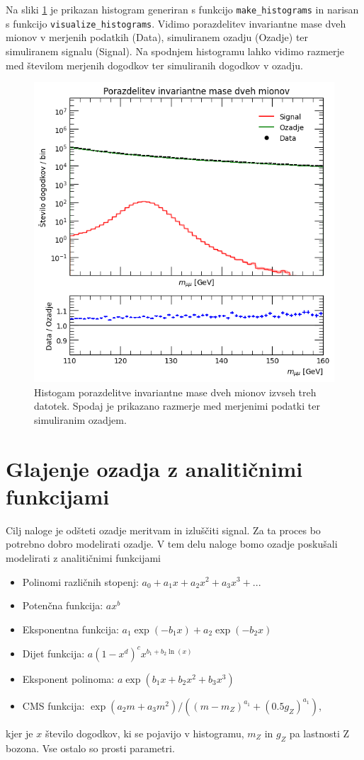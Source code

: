 \documentclass[slovene,11pt,a4paper]{article}
\begin{document}
Na sliki \ref{fig:my_hist} je prikazan histogram generiran s funkcijo \texttt{make\_histograms} in narisan s funkcijo \linebreak \texttt{visualize\_histograms}. Vidimo porazdelitev invariantne mase dveh mionov v merjenih podatkih (Data), simuliranem ozadju (Ozadje) ter simuliranem signalu (Signal). Na spodnjem histogramu lahko vidimo razmerje med številom merjenih dogodkov ter simuliranih dogodkov v ozadju.

\begin{figure}[h!]
    \centering
    \includegraphics[width=0.8\linewidth]{imgs/my_hist.png}
    \caption{Histogam porazdelitve invariantne mase dveh mionov izvseh treh datotek. Spodaj je prikazano razmerje med merjenimi podatki ter simuliranim ozadjem.}
    \label{fig:my_hist}
\end{figure}

\section{Glajenje ozadja z analitičnimi funkcijami}

Cilj naloge je odšteti ozadje meritvam in izluščiti signal. Za ta proces bo potrebno dobro modelirati ozadje. V tem delu naloge bomo ozadje poskušali modelirati z analitičnimi funkcijami

\begin{itemize}
    \item Polinomi različnih stopenj: $a_0 + a_1 x + a_2 x^2 + a_3 x^3 + ...$
    \item Potenčna funkcija: $ax^b$
    \item Eksponentna funkcija: $a_1 \exp(-b_1 x) + a_2 \exp(-b_2 x)$
    \item Dijet funkcija: $a(1-x^d)^c x^{b_1 + b_2 \ln(x)}$
    \item Eksponent polinoma: $a \exp(b_1 x + b_2 x^2 + b_3 x^3)$
    \item CMS funkcija: $\exp(a_2 m + a_3 m^2) / ((m-m_Z)^{a_1} + (0.5g_Z)^{a_1})$,
\end{itemize}
kjer je $x$ število dogodkov, ki se pojavijo v histogramu, $m_Z$ in $g_Z$ pa lastnosti Z bozona. Vse ostalo so prosti parametri.
\end{document}
